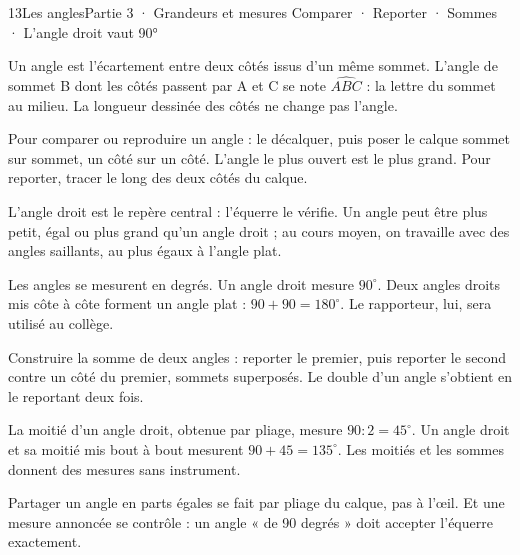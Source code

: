 \begin{ouverture}[grandeurs]{13}{Les angles}{Partie 3 · Grandeurs et mesures}
{Comparer · Reporter · Sommes · L’angle droit vaut 90°}
\end{ouverture}
\pagestyle{otMain}\essentiel\fontsize{11}{15}\selectfont
{}\label{cours-13-1}
\begin{definition}Un angle est l’écartement entre deux côtés issus d’un même sommet. L’angle de sommet B dont les côtés passent par A et C se note $\widehat{ABC}$ : la lettre du sommet au milieu. La longueur dessinée des côtés ne change pas l’angle.\end{definition}
\label{fig-cours-13-1-cours-angle-calque}

\begin{savoirfaire}Pour comparer ou reproduire un angle : le décalquer, puis poser le calque sommet sur sommet, un côté sur un côté. L’angle le plus ouvert est le plus grand. Pour reporter, tracer le long des deux côtés du calque.\end{savoirfaire}
\begin{propriete}L’angle droit est le repère central : l’équerre le vérifie. Un angle peut être plus petit, égal ou plus grand qu’un angle droit ; au cours moyen, on travaille avec des angles saillants, au plus égaux à l’angle plat.\end{propriete}
\clearpage
{}\label{cours-13-2}
\begin{definition}Les angles se mesurent en degrés. Un angle droit mesure $90^\circ$. Deux angles droits mis côte à côte forment un angle plat : $90+90=180^\circ$. Le rapporteur, lui, sera utilisé au collège.\end{definition}
\begin{savoirfaire}Construire la somme de deux angles : reporter le premier, puis reporter le second contre un côté du premier, sommets superposés. Le double d’un angle s’obtient en le reportant deux fois.\end{savoirfaire}
\begin{exemple}La moitié d’un angle droit, obtenue par pliage, mesure $90:2=45^\circ$. Un angle droit et sa moitié mis bout à bout mesurent $90+45=135^\circ$. Les moitiés et les sommes donnent des mesures sans instrument.\end{exemple}
\begin{attention}Partager un angle en parts égales se fait par pliage du calque, pas à l’œil. Et une mesure annoncée se contrôle : un angle « de 90 degrés » doit accepter l’équerre exactement.\end{attention}

